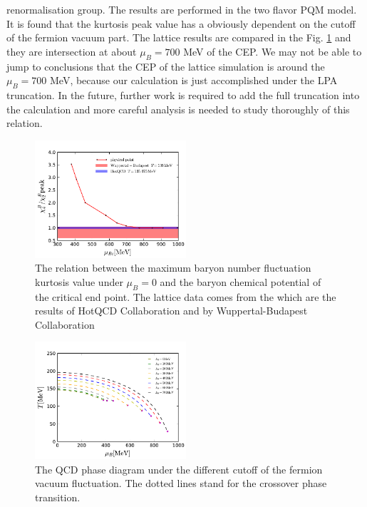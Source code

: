 \documentclass[%
reprint,
superscriptaddress,
showpacs,preprintnumbers,
 amsmath,amssymb,
 aps,
prl,
]{revtex4-1}
\begin{document}
renormalisation group. The results are performed in the two flavor PQM model. It is found that the kurtosis peak value has a obviously dependent on the cutoff of the fermion vacuum part. The lattice results are compared in the Fig. \ref{fig:cp} and they are intersection at about $\mu_B=700$ MeV of the CEP. We may not be able to jump to conclusions that the CEP of the lattice simulation is around the $\mu_B=700$ MeV, because our calculation is just accomplished under the LPA truncation. In the future, further work is required to add the full truncation into the calculation and more careful analysis is needed to study thoroughly of this relation.
%
\begin{figure}[t]
\includegraphics[width=0.5\textwidth]{cp}
\caption{The relation between the maximum baryon number fluctuation kurtosis value under $\mu_B=0$ and the baryon chemical potential of the critical end point. The lattice data comes from the \cite{Bazavov:2017dus,Bazavov:2017tot} which are the results of HotQCD Collaboration and \cite{Borsanyi:2013hza} by Wuppertal-Budapest Collaboration}\label{fig:cp}
\end{figure}
%
%
\begin{figure}[t]
\includegraphics[width=0.5\textwidth]{phasediagram}
\caption{The QCD phase diagram under the different cutoff of the fermion vacuum fluctuation. The dotted lines stand for the crossover phase transition.}\label{fig:pd}
\end{figure}
%
\end{document}
